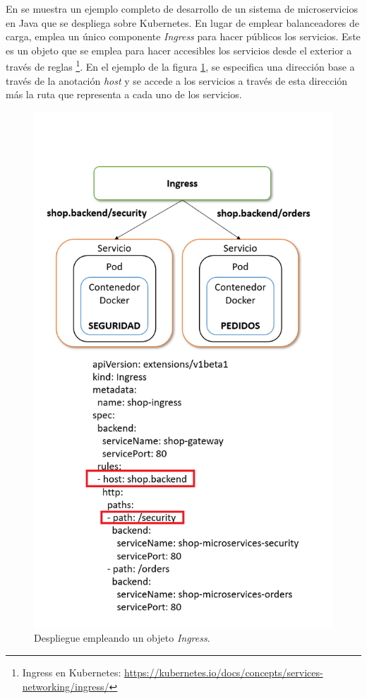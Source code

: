 \documentclass[11pt,spanish,listoffigures]{tfgetsinf}
\begin{document}
\newpage

En \cite{Minkowski2018} se muestra un ejemplo completo de desarrollo de un sistema de microservicios en Java que se despliega sobre Kubernetes. En lugar de emplear balanceadores de carga, emplea un único componente \textit{Ingress} para hacer públicos los servicios. Este es un objeto que se emplea para hacer accesibles los servicios desde el exterior a través de reglas \footnote{Ingress en Kubernetes: \url{https://kubernetes.io/docs/concepts/services-networking/ingress/}}. En el ejemplo de la figura \ref{fig:Ingress}, se especifica una dirección base a través de la anotación \textit{host} y se accede a los servicios a través de esta dirección más la ruta que representa a cada uno de los servicios.

\begin{figure}[h]
\centering
\includegraphics[scale=0.7]{Ingress}
\caption{Despliegue empleando un objeto \textit{Ingress}.}
\label{fig:Ingress}
\end{figure}
\end{document}
